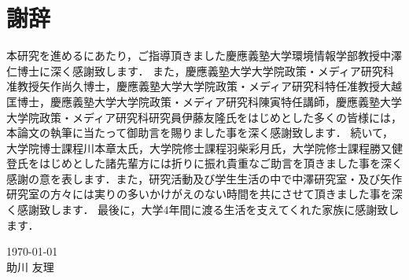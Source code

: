 \chapter*{謝辞}
本研究を進めるにあたり，ご指導頂きました慶應義塾大学環境情報学部教授中澤仁博士に深く感謝致します．
また，慶應義塾大学大学院政策・メディア研究科准教授矢作尚久博士，慶應義塾大学大学院政策・メディア研究科特任准教授大越匡博士，慶應義塾大学大学院政策・メディア研究科陳寅特任講師，慶應義塾大学大学院政策・メディア研究科研究員伊藤友隆氏をはじめとした多くの皆様には，本論文の執筆に当たって御助言を賜りました事を深く感謝致します．
続いて，大学院博士課程川本章太氏，大学院修士課程羽柴彩月氏，大学院修士課程勝又健登氏をはじめとした諸先輩方には折りに振れ貴重なご助言を頂きました事を深く感謝の意を表します．また，研究活動及び学生生活の中で中澤研究室・及び矢作研究室の方々には実りの多いかけがえのない時間を共にさせて頂きました事を深く感謝致します．
最後に，大学4年間に渡る生活を支えてくれた家族に感謝致します．

\begin{flushright}
\today\\
助川 友理
\end{flushright}